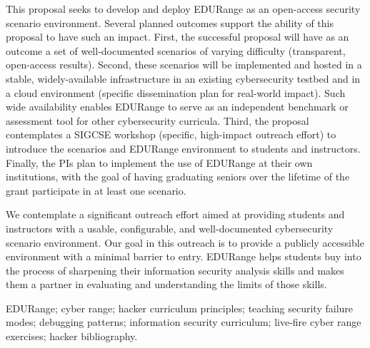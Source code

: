 \documentclass[11pt]{report}
\begin{document}
This proposal seeks to develop and
deploy EDURange as an open-access security scenario environment.
Several planned outcomes support the ability of this proposal to have
such an impact.  First, the successful proposal will have as an
outcome a set of well-documented scenarios of varying difficulty
(transparent, open-access results).  Second, these scenarios will be
implemented and hosted in a stable, widely-available infrastructure in
an existing cybersecurity testbed and in a cloud environment (specific
dissemination plan for real-world impact).  Such wide availability
enables EDURange to serve as an independent benchmark or assessment
tool for other cybersecurity curricula.  Third, the proposal
contemplates a SIGCSE workshop (specific, high-impact outreach effort)
to introduce the scenarios and EDURange environment to students and
instructors. Finally, the PIs plan to implement the use of EDURange at
their own institutions, with the goal of having graduating seniors
over the lifetime of the grant participate in at least one scenario.

We contemplate a significant outreach effort aimed at providing
students and instructors with a usable, configurable, and
well-documented cybersecurity scenario environment.  Our goal in this
outreach is to provide a publicly accessible environment with a
minimal barrier to entry.  EDURange helps students buy into the
process of sharpening their information security analysis skills and
makes them a partner in evaluating and understanding the limits of
those skills.

 EDURange; cyber range; hacker curriculum
principles; teaching security failure modes; debugging patterns;
information security curriculum; live-fire cyber range exercises;
hacker bibliography.
\end{document}
